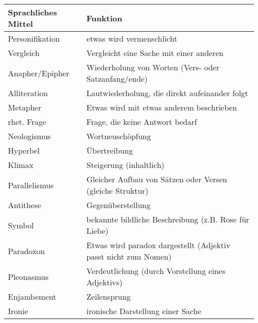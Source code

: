 \documentclass[12pt,a4paper]{report}
\begin{document}
	\begin{tabularx}{0.9\textwidth}{|X|X|}
		\hline
		\textbf{Sprachliches Mittel} & \textbf{Funktion} \\		\hline
		Personifikation & etwas wird vermenschlicht \\
		\hline
		Vergleich & Vergleicht eine Sache mit einer anderen \\
		\hline
		Anapher/Epipher & Wiederholung von Worten (Vers- oder Satzanfang/ende) \\
		\hline
		Alliteration & Lautwiederholung, die direkt aufeinander folgt \\
		\hline
		Metapher & Etwas wird mit etwas anderem beschrieben\\
		\hline
		rhet. Frage & Frage, die keine Antwort bedarf \\
		\hline
		Neologismus & Wortneuschöpfung \\
		\hline
		Hyperbel & Übertreibung \\
		\hline
		Klimax & Steigerung (inhaltlich) \\
		\hline
		Parallelismus & Gleicher Aufbau von Sätzen oder Versen (gleiche Struktur) \\
		\hline
		Antithese & Gegenüberstellung \\
		\hline
		Symbol & bekannte bildliche Beschreibung (z.B. Rose für Liebe)\\
		\hline
		Paradoxon & Etwas wird paradox dargestellt (Adjektiv passt nicht zum Nomen) \\
		\hline
		Pleonasmus & Verdeutlichung (durch Vorstellung eines Adjektivs) \\
		\hline
		Enjambement & Zeilensprung \\
		\hline
		Ironie & ironische Darstellung einer Sache\\
		\hline
	\end{tabularx}
\end{document}
